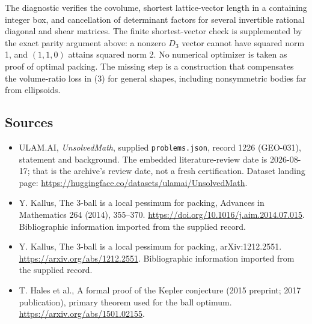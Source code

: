 \documentclass[11pt,a4paper]{article}
\begin{document}
The diagnostic verifies the covolume, shortest lattice-vector length in a containing integer box, and cancellation of determinant factors for several invertible rational diagonal and shear matrices. The finite shortest-vector check is supplemented by the exact parity argument above: a nonzero $D_3$ vector cannot have squared norm 1, and $(1,1,0)$ attains squared norm 2. No numerical optimizer is taken as proof of optimal packing. The missing step is a construction that compensates the volume-ratio loss in (3) for general shapes, including nonsymmetric bodies far from ellipsoids.

\subsection{Sources}

{\small

\begin{itemize}

\item[\hypertarget{source:1226:1}{S1}] ULAM.AI, \emph{UnsolvedMath}, supplied \texttt{problems.json}, record 1226 (GEO-031), statement and background. The embedded literature-review date is 2026-08-17; that is the archive’s review date, not a fresh certification. Dataset landing page: \url{https://huggingface.co/datasets/ulamai/UnsolvedMath}.

\item[\hypertarget{source:1226:2}{S2}] Y. Kallus, The 3-ball is a local pessimum for packing, Advances in Mathematics 264 (2014), 355–370. \url{https://doi.org/10.1016/j.aim.2014.07.015}. Bibliographic information imported from the supplied record.

\item[\hypertarget{source:1226:3}{S3}] Y. Kallus, The 3-ball is a local pessimum for packing, arXiv:1212.2551. \url{https://arxiv.org/abs/1212.2551}. Bibliographic information imported from the supplied record.

\item[R1] T. Hales et al., A formal proof of the Kepler conjecture (2015 preprint; 2017 publication), primary theorem used for the ball optimum.
\url{https://arxiv.org/abs/1501.02155}.
\end{itemize}

}

\label{end:1226}
\end{document}
